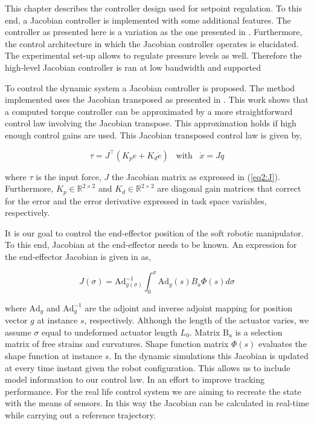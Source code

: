 
This chapter describes the controller design used for setpoint regulation. To this end, a Jacobian controller is implemented with some additional features. The controller as presented here is a variation as the one presented in \cite{MOOSAVIAN20071226}. Furthermore, the control architecture in which the Jacobian controller operates is elucidated. The experimental set-up allows to regulate pressure levels as well. Therefore the high-level Jacobian controller is ran at low bandwidth and supported 







To control the dynamic system a Jacobian controller is proposed. The method implemented uses the Jacobian transposed as presented in . This work shows that a computed torque controller can be approximated by a more straightforward control law involving the Jacobian transpose. This approximation holds if high enough control gains are used. This Jacobian transposed control law is given by,

\begin{equation}
    \tau = J^\top (K_p e + K_d \dot{e}) \hspace{10pt} \text{with}  \hspace{10pt} \dot{x} = J\dot{q}
    \label{eq:tau}
\end{equation}

where $\tau$ is the input force, $J$ the Jacobian matrix as expressed in (\ref{eq2:J}). Furthermore, $K_p \in \mathbb{R}^{2\times 2}$ and $K_d \in \mathbb{R}^{2\times 2}$ are diagonal gain matrices that correct for the error and the error derivative expressed in task space variables, respectively. 

It is our goal to control the end-effector position of the soft robotic manipulator. To this end, Jacobian at the end-effector needs to be known. An expression for the end-effector Jacobian is given in \cite{Boyer2019} as,

\begin{equation}
    J(\sigma) = \text{Ad}^{-1}_{g(\sigma)} \int_0^\sigma \text{Ad}_g(s) B_a \Phi(s)d\sigma
\end{equation}


where $\text{Ad}_g$ and  $\text{Ad}^{-1}_g$ are the adjoint and inverse adjoint mapping for position vector $g$ at instance $s$, respectively. Although the length of the actuator varies, we assume $\sigma$ equal to undeformed actuator length $L_0$. Matrix $\text{B}_a$ is a selection matrix of free strains and curvatures. Shape function matrix $\Phi(s)$ evaluates the shape function at instance $s$. In the dynamic simulations this Jacobian is updated at every time instant given the robot configuration. This allows us to include model information to our control law.  In an effort to improve tracking performance. For the real life control system we are aiming to recreate the state with the means of sensors. In this way the Jacobian can be calculated in real-time while carrying out a reference trajectory.